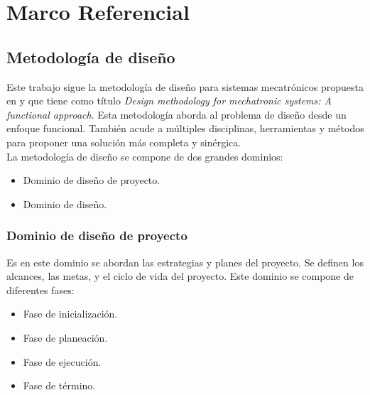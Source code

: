 \chapter{Marco Referencial} \label{ch:marcoref}


	\section{Metodolog\'ia de dise\~{n}o} \label{sec:metodologia}
Este trabajo sigue la metodolog\'ia de dise\~{n}o para sistemas mecatr\'onicos propuesta en \cite{diegoflores_2018} y que tiene como t\'itulo \textit{Design methodology for mechatronic systems: A functional approach}. Esta metodolog\'ia aborda al problema de dise\~{n}o desde un enfoque funcional. Tambi\'en acude a m\'ultiples disciplinas, herramientas y m\'etodos para proponer una soluci\'on m\'as completa y sin\'ergica.\\

\noindent La metodolog\'ia de dise\~{n}o se compone de dos grandes dominios:

\begin{itemize}
	\item Dominio de dise\~{n}o de proyecto.
	\item Dominio de dise\~{n}o.
\end{itemize}

		\subsection*{Dominio de dise\~{n}o de proyecto}
\noindent Es en este dominio se abordan las estrategias y planes del proyecto. Se definen los alcances, las metas, y el ciclo de vida del proyecto. Este dominio se compone de diferentes fases:

\begin{itemize}
	\item Fase de inicializaci\'on. 
	\item Fase de planeaci\'on.
	\item Fase de ejecuci\'on.
	\item Fase de t\'ermino.
\end{itemize}

